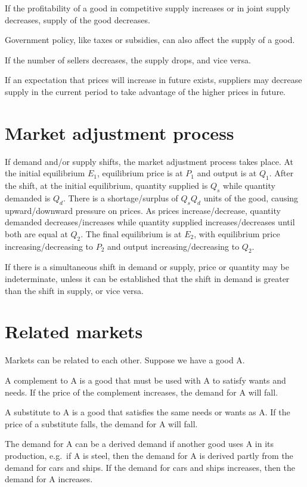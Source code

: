 \documentclass[Economics.tex]{subfiles}
\begin{document}
If the profitability of a good in competitive supply increases or in joint supply decreases, supply of the good decreases.

Government policy, like taxes or subsidies, can also affect the supply of a good.

If the number of sellers decreases, the supply drops, and vice versa.

If an expectation that prices will increase in future exists, suppliers may decrease supply in the current period to take advantage of the higher prices in future.
\section{Market adjustment process}
If demand and\slash{}or supply shifts, the market adjustment process takes place. At the initial equilibrium \(E_1\), equilibrium price is at \(P_1\) and output is at \(Q_1\). After the shift, at the initial equilibrium, quantity supplied is \(Q_s\) while quantity demanded is \(Q_d\). There is a shortage\slash{}surplus of \(Q_s Q_d\) units of the good, causing upward\slash{}downward pressure on prices. As prices increase\slash{}decrease, quantity demanded decreases\slash{}increases while quantity supplied increases\slash{}decreases until both are equal at \(Q_2\). The final equilibrium is at \(E_2\), with equilibrium price increasing/decreasing to \(P_2\) and output increasing\slash{}decreasing to \(Q_2\).

If there is a simultaneous shift in demand or supply, price or quantity may be indeterminate, unless it can be established that the shift in demand is greater than the shift in supply, or vice versa.
\section{Related markets}
Markets can be related to each other. Suppose we have a good A.

A complement to A is a good that must be used with A to satisfy wants and needs. If the price of the complement increases, the demand for A will fall.

A substitute to A is a good that satisfies the same needs or wants as A. If the price of a substitute falls, the demand for A will fall.

The demand for A can be a derived demand if another good uses A in its production, e.g.\ if A is steel, then the demand for A is derived partly from the demand for cars and ships. If the demand for cars and ships increases, then the demand for A increases.
\end{document}
